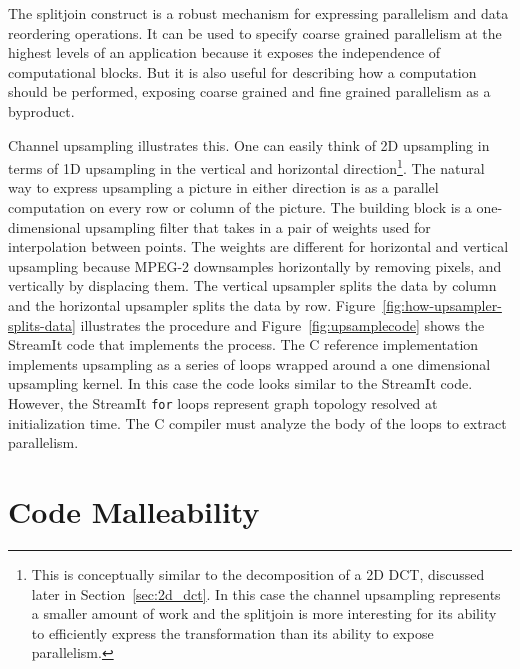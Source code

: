 The splitjoin construct is a robust mechanism for expressing 
parallelism and data reordering operations. It can be used 
to specify coarse grained parallelism at the highest levels 
of an application because it exposes the independence of computational 
blocks. But it is also useful for describing how a 
computation should be performed, exposing 
coarse grained and fine grained parallelism 
as a byproduct. 

Channel upsampling illustrates this. One can easily 
think of 2D upsampling in terms of 1D upsampling in the vertical 
and horizontal direction\footnote{This is conceptually similar
to the decomposition of a 2D DCT, discussed 
later in Section~\ref{sec:2d_dct}. 
In this case the channel upsampling represents a smaller
amount of work and the splitjoin is more interesting for its
ability to efficiently express the transformation than its ability
to expose parallelism.}. The 
natural way to express upsampling a picture in either 
direction is as a parallel computation on every row or 
column of the picture. The building block is a one-dimensional 
upsampling filter that takes in a pair of weights used for 
interpolation between points. The weights are different for 
horizontal and vertical upsampling because MPEG-2 downsamples 
horizontally by removing pixels, and vertically by displacing 
them. 
The vertical upsampler splits the 
data by column and the horizontal upsampler splits the data 
by row. Figure~\ref{fig:how-upsampler-splits-data} illustrates 
the procedure and Figure~\ref{fig:upsamplecode} shows the 
StreamIt code that implements the process. The C reference
implementation implements upsampling as a series of loops
wrapped around a one dimensional upsampling kernel. In this
case the code looks similar to the StreamIt code. However,
the StreamIt \texttt{for} loops represent graph topology
resolved at initialization time. The C compiler must analyze
the body of the loops to extract parallelism.

\section{Code Malleability}
\label{section:chroma}

